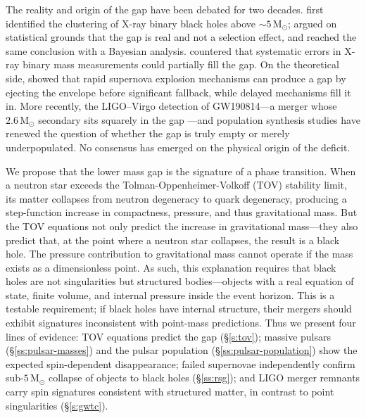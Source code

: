\documentclass[manuscript,linenumbers]{aastex701}
\newcommand{\Msun}{\mathrm{M}_\odot}
\begin{document}
The reality and origin of the gap have been debated for two decades.
\citet{Bailyn1998} first identified the clustering of X-ray binary
black holes above ${\sim}5\,\Msun$; \citet{Ozel2010} argued on
statistical grounds that the gap is real and not a selection effect,
and \citet{Farr2011} reached the same conclusion with a Bayesian
analysis.  \citet{Kreidberg2012} countered that systematic errors in
X-ray binary mass measurements could partially fill the gap.  On the
theoretical side, \citet{Fryer2012} showed that rapid supernova
explosion mechanisms can produce a gap by ejecting the envelope before
significant fallback, while delayed mechanisms fill it in.  More
recently, the LIGO--Virgo detection of GW190814---a merger whose
$2.6\,\Msun$ secondary sits squarely in the gap
\citep{GW190814}---and population synthesis studies
\citep{Zevin2020} have renewed the question of whether the gap is
truly empty or merely underpopulated.  No consensus has emerged on the
physical origin of the deficit.

We propose that the lower mass gap is the signature of a phase
transition.  When a neutron star exceeds the Tolman-Oppenheimer-Volkoff
(TOV) stability limit, its matter collapses from neutron degeneracy to
quark degeneracy, producing a step-function increase in compactness,
pressure, and thus gravitational mass. But the TOV equations not only
predict the increase in gravitational mass---they also predict that,
at the point where a neutron star collapses, the result is a black
hole.  The pressure contribution to gravitational mass cannot operate
if the mass exists as a dimensionless point.  As such, this
explanation requires that black holes are not singularities but
structured bodies---objects with a real equation of state, finite
volume, and internal pressure inside the event horizon.  This is a
testable requirement; if black holes have internal structure, their
mergers should exhibit signatures inconsistent with point-mass
predictions.  Thus we present four lines of evidence:
TOV equations predict the gap (\S\ref{s:tov});
massive pulsars (\S\ref{ss:pulsar-masses}) and the pulsar population
(\S\ref{ss:pulsar-population}) show the expected spin-dependent
disappearance;
failed supernovae independently confirm sub-$5\,\Msun$ collapse of
objects to black holes (\S\ref{ss:rsg});
and LIGO merger remnants carry spin signatures consistent with
structured matter, in contrast to point singularities (\S\ref{s:gwtc}).

\end{document}
